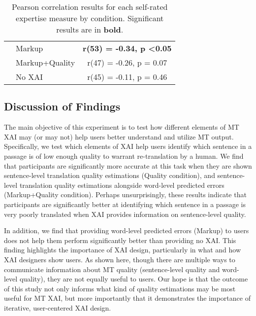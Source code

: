 \begin{table}[]
{\begin{tabular}{llc}
                                                       & Markup                        & \textbf{r(53) = -0.34, p \textless 0.05}          \\
                                                       & Markup+Quality                & r(47) = -0.26, p = 0.07                  \\
                                                       & No XAI                        & r(45) = -0.11, p = 0.46                  \\ \hline
\end{tabular}%
}
\caption{Pearson correlation results for each self-rated expertise measure by condition. Significant results are in \textbf{bold}.}
\label{tab:exp1_expertise_stats}
\end{table}

\subsection{Discussion of Findings} 


The main objective of this experiment is to test how different elements of MT XAI may (or may not) help users better understand and utilize MT output. Specifically, we test which elements of XAI help users identify which sentence in a passage is of low enough quality to warrant re-translation by a human. We find that participants are significantly more accurate at this task when they are shown sentence-level translation quality estimations (Quality condition), and sentence-level translation quality estimations alongside word-level predicted errors (Markup+Quality condition). Perhaps unsurprisingly, these results indicate that participants are significantly better at identifying which sentence in a passage is very poorly translated when XAI provides information on sentence-level quality. 

In addition, we find that providing word-level predicted errors (Markup) to users does not help them perform significantly better than providing no XAI. This finding highlights the importance of XAI design, particularly in what and how XAI designers show users. As shown here, though there are multiple ways to communicate information about MT quality (sentence-level quality and word-level quality), they are not equally useful to users. Our hope is that the outcome of this study not only informs what kind of quality estimations may be most useful for MT XAI, but more importantly that it demonstrates the importance of iterative, user-centered XAI design.

